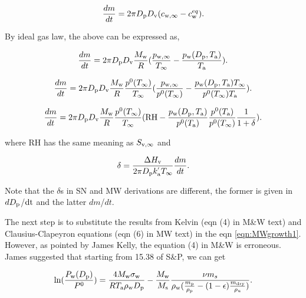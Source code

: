 \documentclass[12pt]{article}
\begin{document}
\begin{equation}\label{eqn:18}
\frac{dm}{dt}=2 \pi D_{\rm p} D_{\rm v} (c_{\rm w, \infty} - c_{\rm w}^{eq}).  
\end{equation}

By ideal gas law, the above can be expressed as,

\begin{equation}\label{eqn:19}
\frac{dm}{dt}=2 \pi D_{\rm p} D_{\rm v} \frac{M_{\rm w}}{R} (\frac{p_{\rm w, \infty}}{T_{\infty}} - \frac{p_{\rm w}(D_{\rm p}, T_{\rm a})}{T_{\rm a}}).
\end{equation}


\begin{equation}\label{eqn:20}
\frac{dm}{dt}=2 \pi D_{\rm p} D_{\rm v} \frac{M_{\rm w}}{R}  \frac{p^{\rm 0}(T_{\infty})} {T_{\infty}} (\frac{p_{\rm w, \infty}}{p^{\rm 0}(T_{\infty})} - \frac{p_{\rm w}(D_{\rm p}, T_{\rm a}) T_{\infty}}{p^{\rm 0}(T_{\infty}) T_{\rm a}}).
\end{equation}


\begin{equation}\label{eqn:MWgrowth1}
\frac{dm}{dt}=2 \pi D_{\rm p} D_{\rm v}  \frac{M_{\rm w}}{R} \frac{p^{\rm 0}(T_{\infty})} {T_{\infty}} (\textrm{RH} - \frac{p_{\rm w}(D_{\rm p}, T_{\rm a})}{p^{\rm 0}(T_{\rm a})} \frac{p^{\rm 0}(T_{\rm a})}{p^{\rm 0}(T_{\infty})}\frac{1}{1+\delta}).
\end{equation}

where RH has the same meaning as $S_{\rm v, \infty}$ and 


\begin{equation}
\delta=\frac{\Delta H_{\rm v}}{2 \pi D_{\rm p} k^{'}_{\rm a} T_{\infty}} \frac{dm}{dt}.
\end{equation}

Note that the $\delta$s in SN and MW derivations are different, the former is given in $dD_{\rm p}$/$\rm dt$ and the latter $dm$/$dt$.

The next step is to substitute the results from Kelvin (eqn (4) in M\&W text) and Clausius-Clapeyron equations (eqn (6) in MW text) in the eqn \ref{eqn:MWgrowth1}. However, as pointed by James Kelly, the equation (4) in M\&W is erroneous. James suggested that starting from 15.38 of S\&P, we can get 

\begin{equation} 
\ln(\frac{P_{\rm w}(D_{\rm p})}{P^{\rm 0}})=\frac{4 M_{\rm w} \sigma_{\rm w}}{R T_{\rm a} \rho_{\rm w}D_{\rm p}}-\frac{M_{\rm w}}{M_{\rm s}}\frac{\nu m_{s}}{\rho_{\rm w}(\frac{m_{\rm p}}{\rho_{\rm p}}-(1-\epsilon)\frac{m_{\rm dry}}{\rho_{\rm u}})}.
\end{equation}
\end{document}

